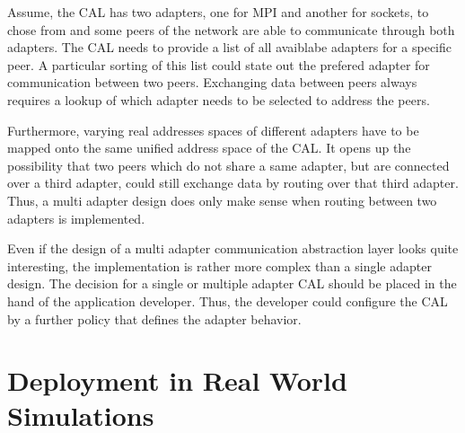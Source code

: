 Assume, the CAL has two adapters, one for MPI and another for sockets,
to chose from and some peers of the network are able to communicate
through both adapters.  The CAL needs to provide a list of all
avaiblabe adapters for a specific peer. A particular sorting of this
list could state out the prefered adapter for communication between
two peers. Exchanging data between peers always requires a lookup of
which adapter needs to be selected to address the peers.





Furthermore, varying real addresses spaces of different adapters have
to be mapped onto the same unified address space of the CAL.  It opens
up the possibility that two peers which do not share a same adapter,
but are connected over a third adapter, could still exchange data by
routing over that third adapter. Thus, a multi adapter design does
only make sense when routing between two adapters is implemented.



Even if the design of a multi adapter communication abstraction layer
looks quite interesting, the implementation is rather more complex
than a single adapter design. The decision for a single or multiple
adapter CAL should be placed in the hand of the application developer.
Thus, the developer could configure the CAL by a further policy that
defines the adapter behavior.


\section*{Deployment in Real World Simulations}


